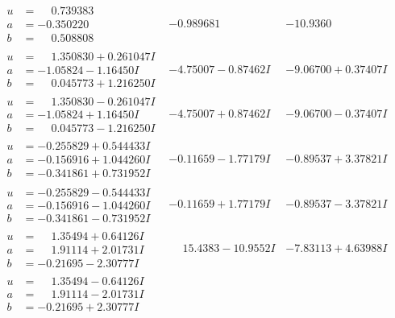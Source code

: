 \documentclass[1p]{elsarticle_modified}
\theoremstyle{definition}
\begin{document}
$$\begin{array}{c|c|c}
\begin{aligned}
u &= \phantom{-}0.739383\phantom{ +0.000000I} \\
a &= -0.350220\phantom{ +0.000000I} \\
b &= \phantom{-}0.508808\phantom{ +0.000000I}\end{aligned}
 & -0.989681\phantom{ +0.000000I} & -10.9360\phantom{ +0.000000I} \\ \hline\begin{aligned}
u &= \phantom{-}1.350830 + 0.261047 I \\
a &= -1.05824 - 1.16450 I \\
b &= \phantom{-}0.045773 + 1.216250 I\end{aligned}
 & -4.75007 - 0.87462 I & -9.06700 + 0.37407 I \\ \hline\begin{aligned}
u &= \phantom{-}1.350830 - 0.261047 I \\
a &= -1.05824 + 1.16450 I \\
b &= \phantom{-}0.045773 - 1.216250 I\end{aligned}
 & -4.75007 + 0.87462 I & -9.06700 - 0.37407 I \\ \hline\begin{aligned}
u &= -0.255829 + 0.544433 I \\
a &= -0.156916 + 1.044260 I \\
b &= -0.341861 + 0.731952 I\end{aligned}
 & -0.11659 - 1.77179 I & -0.89537 + 3.37821 I \\ \hline\begin{aligned}
u &= -0.255829 - 0.544433 I \\
a &= -0.156916 - 1.044260 I \\
b &= -0.341861 - 0.731952 I\end{aligned}
 & -0.11659 + 1.77179 I & -0.89537 - 3.37821 I \\ \hline\begin{aligned}
u &= \phantom{-}1.35494 + 0.64126 I \\
a &= \phantom{-}1.91114 + 2.01731 I \\
b &= -0.21695 - 2.30777 I\end{aligned}
 & \phantom{-}15.4383 - 10.9552 I & -7.83113 + 4.63988 I \\ \hline\begin{aligned}
u &= \phantom{-}1.35494 - 0.64126 I \\
a &= \phantom{-}1.91114 - 2.01731 I \\
b &= -0.21695 + 2.30777 I\end{aligned}

\end{array}$$
\end{document}
